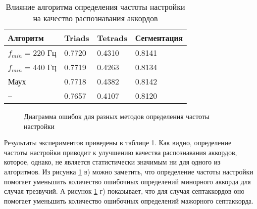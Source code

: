 \begin{table} [htbp]
  \centering
  \parbox{15cm}{\caption{Влияние алгоритма определения частоты настройки на
  качество распознавания аккордов} \label{TTunFreq}}
  \begin{tabular}{|l|l|l|l|}
  \hline
  Алгоритм & Triads & Tetrads & Сегментация \\
  \hline
  $f_{min} = 220$ Гц & 0.7720 & 0.4310 & 0.8141 \\
  $f_{min} = 440$ Гц & 0.7719 & 0.4263 & 0.8134 \\
  Маух \cite{MauchThesis2010} & 0.7718 & 0.4382 & 0.8142 \\
  -- & 0.7657 & 0.4107 & 0.8120 \\
  \hline
  \end{tabular}
\end{table}

\begin{figure}[h]
  \begin{minipage}[h]{0.49\linewidth}
  \end{minipage}
  \hfill
  \begin{minipage}[h]{0.49\linewidth}
  \end{minipage}
  \hfill
  \begin{minipage}[h]{0.49\linewidth}
  \end{minipage}
  \hfill
  \begin{minipage}[h]{0.49\linewidth}
  \end{minipage}
  \caption{Диаграмма ошибок для разных методов определения частоты настройки}
  \label{img:tuning}
\end{figure}

Результаты экспериментов приведены в таблице \ref{TTunFreq}. Как видно,
определение частоты настройки приводит к улучшению качества распознавания
аккордов, которое, однако, не является статистически значимым ни для одного из
алгоритмов. Из рисунка \ref{img:tuning} в) можно заметить, что определение
частоты настройки помогает уменьшить количество ошибочных определений минорного
аккорда для случая трезвучий. А рисунок \ref{img:tuning} г) показывает, что для
случая септаккордов оно помогает уменьшить количество ошибочных определений
мажорного септаккорда.

